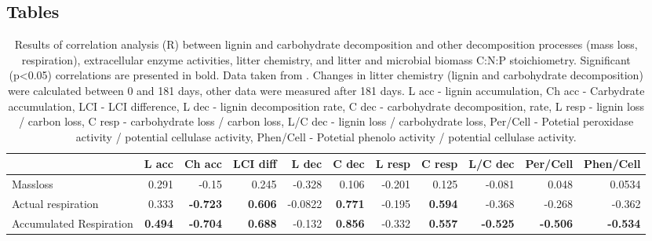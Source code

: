 \documentclass[10pt]{article}
\begin{document}
\begin{flushleft}
\newpage
\section*{Tables}








%


\begin{landscape}

\begin{table}[h!]
\begin{center}
\caption{Results of correlation analysis (R) between lignin and carbohydrate decomposition and other decomposition processes (mass loss, respiration), extracellular enzyme activities, litter chemistry, and litter and microbial biomass C:N:P stoichiometry. Significant (p\textless 0.05) correlations are presented in bold. Data taken from \cite{Mooshammer2011, Leitner2011}. Changes in litter chemistry (lignin and carbohydrate decomposition) were calculated between 0 and 181 days, other data were measured after 181 days. L acc - lignin accumulation, Ch acc - Carbydrate accumulation, LCI - LCI difference, L dec - lignin decomposition rate, C dec - carbohydrate decomposition,  rate, L resp - lignin loss / carbon loss, C resp - carbohydrate loss / carbon loss, L/C dec - lignin loss / carbohydrate loss, Per/Cell - Potetial peroxidase activity / potential cellulase activity, Phen/Cell - Potetial phenolo activity / potential cellulase activity.}
\label{corrtable}
{\small
\begin{tabular}{lrrrrrrrrrr}
  \hline
 & L acc & Ch acc & LCI diff & L dec & C dec & L resp & C resp & L/C dec & Per/Cell & Phen/Cell \\ 
  \hline
Massloss & 0.291 & -0.15 & 0.245 & -0.328 & 0.106 & -0.201 & 0.125 & -0.081 & 0.048 & 0.0534 \\ 
  Actual respiration & 0.333 & \textbf{ -0.723 } & \textbf{ 0.606 } & -0.0822 & \textbf{ 0.771 } & -0.195 & \textbf{ 0.594 } & -0.368 & -0.268 & -0.362 \\ 
  Accumulated Respiration & \textbf{ 0.494 } & \textbf{ -0.704 } & \textbf{ 0.688 } & -0.132 & \textbf{ 0.856 } & -0.332 & \textbf{ 0.557 } & \textbf{ -0.525 } & \textbf{ -0.506 } & \textbf{ -0.534 } \\ 

\end{tabular}}
\end{center}
\end{table}
\end{landscape}
\end{flushleft}
\end{document}
